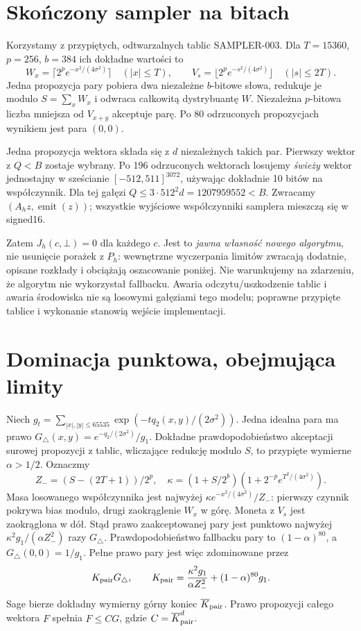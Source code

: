\documentclass[11pt,a4paper]{article}
\newcommand{\botr}{\bot}\newcommand{\Sec}{\operatorname{second}}
\begin{document}
\section{Skończony sampler na bitach}
Korzystamy z przypiętych, odtwarzalnych tablic SAMPLER-003. Dla $T=15360$,
$p=256$, $b=384$ ich dokładne wartości to
\[
 W_x=\lceil 2^p e^{-x^2/(4\sigma^2)}\rceil\quad (|x|\le T),\qquad
 V_s=\lfloor 2^p e^{-s^2/(4\sigma^2)}\rfloor\quad (|s|\le2T).
\]
Jedna propozycja pary pobiera dwa niezależne $b$-bitowe słowa, redukuje
je modulo $S=\sum_xW_x$ i odwraca całkowitą dystrybuantę $W$.
Niezależna $p$-bitowa liczba mniejsza od $V_{x+y}$ akceptuje parę.
Po 80 odrzuconych propozycjach wynikiem jest para $(0,0)$.

Jedna propozycja wektora składa się z $d$ niezależnych takich par.
Pierwszy wektor z $Q<B$ zostaje wybrany. Po 196 odrzuconych wektorach
losujemy \emph{świeży} wektor jednostajny w sześcianie
$[-512,511]^{3072}$, używając dokładnie 10 bitów na współczynnik.
Dla tej gałęzi $Q\le3\cdot512^2d=1207959552<B$.
Zwracamy $(A_hz,\operatorname{emit}(z))$; wszystkie wyjściowe
współczynniki samplera mieszczą się w signed16.

Zatem $J_h(c,\botr)=0$ dla każdego $c$. Jest to \emph{jawna własność
nowego algorytmu}, nie usunięcie porażek z $P_h$: wewnętrzne wyczerpania
limitów zwracają dodatnie, opisane rozkłady i obciążają oszacowanie poniżej.
Nie warunkujemy na zdarzeniu, że algorytm nie wykorzystał fallbacku.
Awaria odczytu/uszkodzenie tablic i awaria środowiska nie są losowymi gałęziami
tego modelu; poprawne przypięte tablice i wykonanie stanowią wejście implementacji.

\section{Dominacja punktowa, obejmująca limity}
Niech $g_t=\sum_{|x|,|y|\le65535}\exp(-tq_2(x,y)/(2\sigma^2))$.
Jedna idealna para ma prawo $G_\triangle(x,y)=e^{-q_2/(2\sigma^2)}/g_1$.
Dokładne prawdopodobieństwo akceptacji surowej propozycji z tablic,
wliczające redukcję modulo $S$, to przypięte wymierne $\alpha>1/2$.
Oznaczmy
\[
 Z_-=(S-(2T+1))/2^p,\quad
 \kappa=(1+S/2^b)(1+2^{-p}e^{T^2/(4\sigma^2)}).
\]
Masa losowanego współczynnika jest najwyżej
$\kappa e^{-x^2/(4\sigma^2)}/Z_-$: pierwszy czynnik pokrywa bias modulo,
drugi zaokrąglenie $W_x$ w górę. Moneta z $V_s$ jest zaokrąglona w dół.
Stąd prawo zaakceptowanej pary jest punktowo najwyżej
$\kappa^2g_1/(\alpha Z_-^2)$ razy $G_\triangle$.
Prawdopodobieństwo fallbacku pary to $(1-\alpha)^{80}$,
a $G_\triangle(0,0)=1/g_1$. Pełne prawo pary jest więc zdominowane przez
\[
 K_{\rm pair}G_\triangle,\qquad
 K_{\rm pair}=\frac{\kappa^2g_1}{\alpha Z_-^2}+(1-\alpha)^{80}g_1.
\]
Sage bierze dokładny wymierny górny koniec $\overline K_{\rm pair}$.
Prawo propozycji całego wektora $F$ spełnia $F\le CG$,
gdzie $C=\overline K_{\rm pair}^{d}$.
\end{document}
